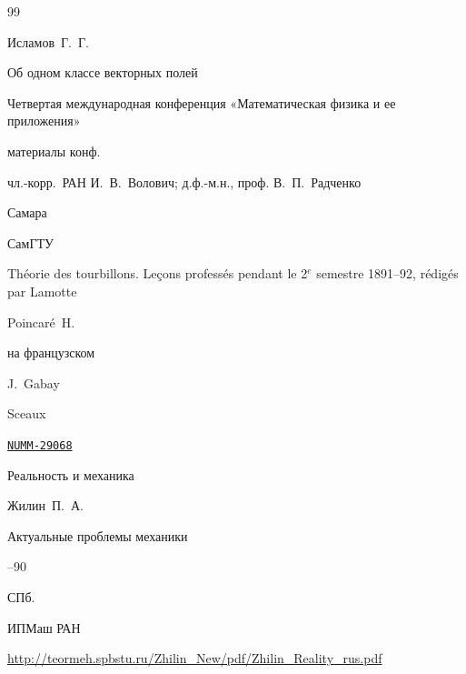 \begin{thebibliography}{99}




\by  Исламов~Г.~Г. 

\paper Об одном классе векторных полей


\inbook Четвертая международная конференция «Математическая физика и ее приложения»

\bookinfo материалы конф. 

\eds чл.-корр.~РАН И.~В.~Волович; д.ф.-м.н., проф. В.~П.~Радченко

\publaddr Самара

\publ СамГТУ









\book Th\'eorie des tourbillons.  Le\c{c}ons profess\'es pendant le 2$^e$ semestre 1891--92, r\'edig\'es par Lamotte


\by Poincar\'e~H.



\lang \Russian на французском

\publ J.~Gabay 

\publaddr Sceaux


\elink \href{visualiseur.bnf.fr/CadresFenetre?O=NUMM-29068}{\tt NUMM-29068}




\paper Реальность и механика

\by Жилин~П.~А.

\inbook Актуальные проблемы механики


--90

\publaddr СПб.

\publ ИПМаш РАН


\elink \url{http://teormeh.spbstu.ru/Zhilin_New/pdf/Zhilin_Reality_rus.pdf}

\morerref


\end{thebibliography}
